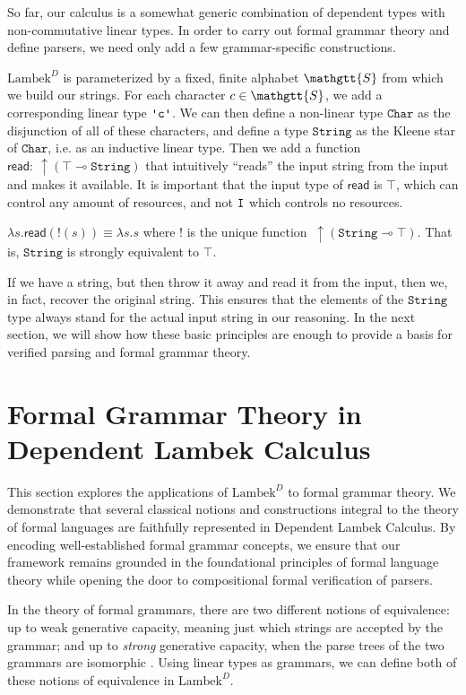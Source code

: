 \documentclass[acmsmall,nonacm]{acmart}
\renewcommand{\Sigma}{\mathgtt{S}}
\newcommand{\lto}{\multimap}
\newcommand{\CharGram}{\texttt{Char}}
\newcommand{\StringGram}{\texttt{String}}
\newcommand{\theoryname}{Dependent Lambek Calculus\xspace}
\newcommand{\theoryabbv}{$\textrm{Lambek}^D$\xspace}
\newcommand{\ltonl}[1]{~\uparrow #1}
\newcommand{\literal}[1]{\texttt{\textquotesingle#1\textquotesingle}}
\begin{document}
{So far, our calculus is a somewhat generic combination of dependent
types with non-commutative linear types. In order to carry out formal
grammar theory and define parsers, we need only add a few
grammar-specific constructions.

\theoryabbv is parameterized by a fixed, finite alphabet $\Sigma$ from which we
build our strings.  For each character $c \in \Sigma$,
we add a corresponding linear type $\literal{c}$. We can then define a
non-linear type $\CharGram$ as the disjunction of all of these characters,
and define a type $\StringGram$ as the Kleene star of $\CharGram$, i.e. as an
inductive linear type.
Then we add a function $\mathsf{read} :
\ltonl{(\top\lto \StringGram)}$ that intuitively ``reads'' the input
string from the input and makes it available. It is important that the
input type of $\mathsf{read}$ is $\top$, which can control any amount
of resources, and not $\texttt{I}$ which controls no resources.


\begin{axiom}
  \label{ax:string-top}
   $\lambda s. \mathsf{read}(!(s)) \equiv \lambda
s. s$ where $!$ is the unique function $\ltonl(\StringGram\lto \top)$. That is, $\StringGram$ is strongly equivalent to $\top$.
\end{axiom}

If we have a string, but then throw it away and read
it from the input, then we, in fact, recover the original string.
This ensures that the elements of the $\StringGram$
type always stand for the actual input string in our reasoning. In the
next section, we will show how these basic principles are enough to
provide a basis for verified parsing and formal grammar theory.

\section{Formal Grammar Theory in \theoryname}
\label{sec:applications}
This section explores the applications of \theoryabbv to formal
grammar theory. We demonstrate that several classical notions and constructions
integral to the theory of formal languages are faithfully represented
in \theoryname. By encoding well-established formal grammar concepts, we ensure
that our framework remains grounded in the
foundational principles of formal language theory while opening the door to
compositional formal verification of parsers.

In the theory of formal grammars, there are two different notions of
equivalence: up to weak generative capacity, meaning just which strings are
accepted by the grammar; and up to \emph{strong} generative capacity, when
the parse trees of the two grammars are isomorphic
\cite{chom1963}. Using linear types as grammars, we can define both of
these notions of equivalence in \theoryabbv.

}
\end{document}
